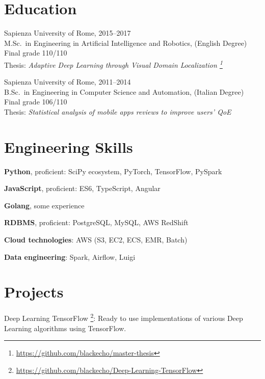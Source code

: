 \documentclass[margin]{res}
\begin{document}
\begin{resume}
        \section{Education}
            Sapienza University of Rome, \hfill 2015--2017 \\
            M.Sc.\ in Engineering in Artificial Intelligence and Robotics, (English Degree) \\
            Final grade 110/110 \\
            Thesis: \textit{Adaptive Deep Learning through Visual Domain Localization \footnote{\url{https://github.com/blackecho/master-thesis}}}

            Sapienza University of Rome, \hfill 2011--2014 \\
            B.Sc.\ in Engineering in Computer Science and Automation, (Italian Degree) \\
            Final grade 106/110 \\
            Thesis: \textit{Statistical analysis of mobile apps reviews to improve users' QoE}

        \section{Engineering Skills}
        \begin{description}
            \item \textbf{Python}, proficient: SciPy ecosystem, PyTorch, TensorFlow, PySpark
            \item \textbf{JavaScript}, proficient: ES6, TypeScript, Angular
            \item \textbf{Golang}, some experience
            \item \textbf{RDBMS}, proficient: PostgreSQL, MySQL, AWS RedShift
            \item \textbf{Cloud technologies}: AWS (S3, EC2, ECS, EMR, Batch)
            \item \textbf{Data engineering}: Spark, Airflow, Luigi
        \end{description}

        \section{Projects}
        \begin{description}
            \item Deep Learning TensorFlow \footnote{\url{https://github.com/blackecho/Deep-Learning-TensorFlow}}:
                Ready to use implementations of various Deep Learning algorithms using TensorFlow.
        \end{description}


\end{resume}
\end{document}
